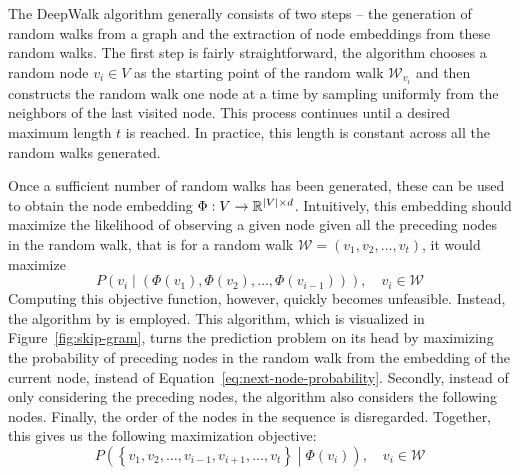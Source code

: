 The DeepWalk algorithm generally consists of two steps -- the generation of random walks from a graph and the extraction of node embeddings from these random walks. The first step is fairly straightforward, the algorithm chooses a random node \( v_i \in V \) as the starting point of the random walk \( \mathcal{W}_{v_i} \) and then constructs the random walk one node at a time by sampling uniformly from the neighbors of the last visited node. This process continues until a desired maximum length \( t \) is reached. In practice, this length is constant across all the random walks generated.

Once a sufficient number of random walks has been generated, these can be used to obtain the node embedding \( \Phi : V \to \mathbb{R}^{\left\lvert V \right\rvert \times d} \). Intuitively, this embedding should maximize the likelihood of observing a given node given all the preceding nodes in the random walk, that is for a random walk \( \mathcal{W} = \left( v_1, v_2, \dots, v_t \right) \), it would maximize
\begin{equation}\label{eq:next-node-probability}
	P \left( v_i \middle| \left( \Phi \left( v_1 \right), \Phi \left( v_2 \right), \dots, \Phi \left( v_{i-1} \right) \right) \right), \quad v_i \in \mathcal{W}
\end{equation}
Computing this objective function, however, quickly becomes unfeasible. Instead, the  algorithm by \cite{mikolov_efficient_2013} is employed. This algorithm, which is visualized in Figure~\ref{fig:skip-gram}, turns the prediction problem on its head by maximizing the probability of preceding nodes in the random walk from the embedding of the current node, instead of Equation~\ref{eq:next-node-probability}. Secondly, instead of only considering the preceding nodes, the algorithm also considers the following nodes. Finally, the order of the nodes in the sequence is disregarded. Together, this gives us the following maximization objective:
\begin{equation}\label{eq:deepwalk-objective}
	P \left( \left\{ v_1, v_2 , \dots, v_{i-1}, v_{i+1}, \dots, v_t \right\} \middle| \Phi \left( v_i \right) \right), \quad v_i \in \mathcal{W}
\end{equation}

